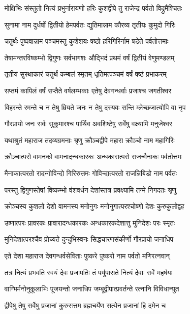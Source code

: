 \twolineshloka
{मोक्षिभिः संस्तुतो नित्यं प्रभुर्नारायणो हरिः}
{कुशद्वीपे तु राजेन्द्र पर्वतो विद्रुमैश्चितः}


\twolineshloka
{सुनामा नाम दुर्धर्षो द्वितीयो हेमपर्वतः}
{द्युतिमान्नाम कौरव्य तृतीयः कुमुदो गिरिः}


\twolineshloka
{चतुर्थः पुष्पवान्नाम पञ्चमस्तु कुशेशयः}
{षष्ठो हरिगिरिर्नाम षडेते पर्वतोत्तमाः}


\twolineshloka
{तेषामन्तरविष्कम्भो द्विगुणः सर्वभागशः}
{औद्भिदं प्रथमं वर्षं द्वितीयं वेणुमण्डलम्}


\twolineshloka
{तृतीयं सुरथाकारं चतुर्थं कम्बलं स्मृतम्}
{धृतिमत्पञ्चमं वर्षं षष्ठं प्रभाकरम्}


\twolineshloka
{सप्तमं कापिलं वर्षं सप्तैते वर्षलम्भकाः}
{एतेषु देवगन्धर्वाः प्रजाश्च जगतीश्वर}


\twolineshloka
{विहरन्ते रमन्ते च न तेषु म्रियते जनः}
{न तेषु दस्यवः सन्ति म्लेच्छजात्योपि वा नृप}


\twolineshloka
{गौरप्रायो जनः सर्वः सुकुमारश्च पार्थिव}
{अवशिष्टेषु सर्वेषु वक्ष्यामि मनुजेश्वर}


\twolineshloka
{यथाश्रुतं महाराज तदव्यग्रमनाः श्रृणु}
{क्रौञ्चद्वीपे महारा क्रौञ्चो नाम महागिरिः}


\threelineshloka
{क्रौञ्चात्परो वामनको वामनादन्धकारकः}
{अन्धकारात्परो राजन्मैनाकः पर्वतोत्तमः}
{}


\twolineshloka
{मैनाकात्परतो रादन्गोविन्दो गिरिरुत्तमः}
{गोविन्दात्परतो राजन्निबिडो नाम पर्वतः}


\twolineshloka
{परस्तु द्विगुणस्तेषां विष्कम्भो वंशवर्धन}
{देशांस्तत्र प्रवक्ष्यामि तन्मे निगदतः श्रृणु}


\twolineshloka
{क्रोञ्चस्य कुशलो देशो वामनस्य मनोनुगः}
{मनोनुगात्परश्चोष्णो देशः कुरुकुलोद्वह}


\twolineshloka
{उष्णात्परः प्रावरकः प्रावारादन्धकारकः}
{अन्धकारकदेशात्तु मुनिदेशः परः स्मृतः}


\twolineshloka
{मुनिदेशात्परश्चैव प्रोच्यते दुन्दुभिस्वनः}
{सिद्धचारणसंकीर्णो गौरप्रायो जनाधिप}


\twolineshloka
{एते देशा महाराज देवगन्धर्वसेविताः}
{पुष्करे पुष्करो नाम पर्वतो मणिरत्नवान्}


\twolineshloka
{तत्र नित्यं प्रभवति स्वयं देवः प्रजापतिः}
{तं पर्युपासते नित्यं देवाः सर्वे महर्षयः}


\twolineshloka
{वाग्भिर्मनोनुकूलाभिः पूजयन्तो जनाधिप}
{जम्बूद्वीपात्प्रवर्तन्ते रत्नानि विविधान्युत}


\twolineshloka
{द्वीपेषु तेषु सर्वेषु प्रजानां कुरुसत्तम}
{ब्रह्मचर्येण सत्येन प्रजानां हि दमेन च}


